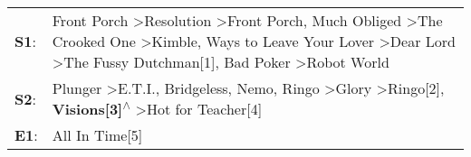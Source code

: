 \begin{supertabular}{p{0.03\textwidth}p{0.92\textwidth}}
 \textbf{S1}:  &  Front Porch\textsuperscript{} \textgreater \enspace Resolution\textsuperscript{} \textgreater \enspace Front Porch\textsuperscript{}, \enspace Much Obliged\textsuperscript{} \textgreater \enspace The Crooked One\textsuperscript{} \textgreater \enspace Kimble\textsuperscript{},  Ways to Leave Your Lover\textsuperscript{} \textgreater \enspace Dear Lord\textsuperscript{} \textgreater \enspace The Fussy Dutchman[1]\textsuperscript{}, \enspace Bad Poker\textsuperscript{} \textgreater \enspace Robot World\textsuperscript{}  \enspace  \\
 \textbf{S2}:  &                                                                                                                                                    Plunger\textsuperscript{} \textgreater \enspace E.T.I.\textsuperscript{}, \enspace Bridgeless\textsuperscript{}, \enspace Nemo\textsuperscript{}, \enspace Ringo\textsuperscript{} \textgreater \enspace Glory\textsuperscript{} \textgreater \enspace Ringo[2]\textsuperscript{}, \enspace \textbf{Visions[3]\textsuperscript{$\wedge$}} \textgreater \enspace Hot for Teacher[4]\textsuperscript{}  \enspace  \\
 \textbf{E1}:  &                                                                                                                                                                                                                                                                                                                                                                                                                                                                                                                        All In Time[5]\textsuperscript{}  \enspace  \\
\end{supertabular}
